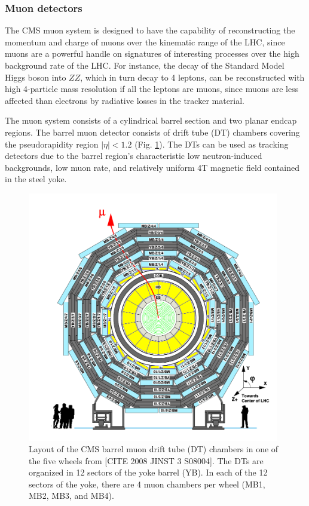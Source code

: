 \documentclass{article}
\begin{document}
\subsubsection{Muon detectors}

The CMS muon system is designed to have the capability of reconstructing the momentum and charge of muons over the kinematic range of the LHC, since muons are a powerful handle on signatures of interesting processes over the high background rate of the LHC. For instance, the decay of the Standard Model Higgs boson into $ZZ$, which in turn decay to 4 leptons, can be reconstructed with high 4-particle mass resolution if all the leptons are muons, since muons are less affected than electrons by radiative losses in the tracker material. 

The muon system consists of a cylindrical barrel section and two planar endcap regions. The barrel muon detector consists of drift tube (DT) chambers covering the pseudorapidity region $|\eta| < 1.2$ (Fig. \ref{fig:phase-1-muon-barrel-DT-schematic}). The DTs can be used as tracking detectors due to the barrel region's characteristic low neutron-induced backgrounds, low muon rate, and relatively uniform 4T magnetic field contained in the steel yoke. 

\begin{figure}[ht]
    \centering
    \includegraphics[width=11cm]{figures/phase-1-muon-barrel-DT-schematic.png}
    \caption{Layout of the CMS barrel muon drift tube (DT) chambers in one of the five wheels from [CITE 2008 JINST 3 S08004]. The DTs are organized in 12 sectors of the yoke barrel (YB). In each of the 12 sectors of the yoke, there are 4 muon chambers per wheel (MB1, MB2, MB3, and MB4).}
    \label{fig:phase-1-muon-barrel-DT-schematic}
\end{figure}
\end{document}
